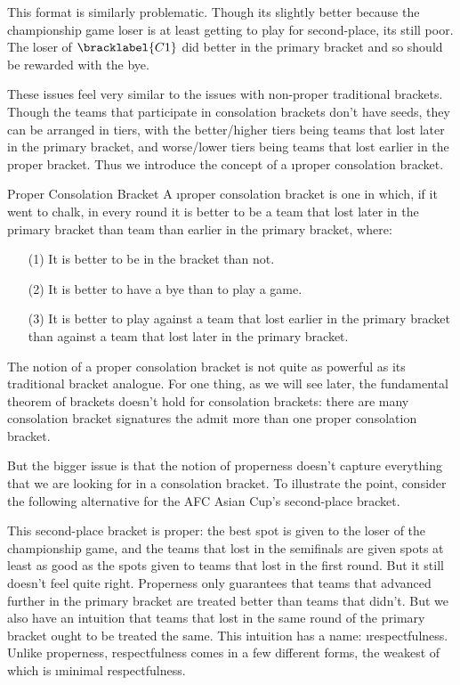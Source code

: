 {    

    This format is similarly problematic. Though its slightly better because the championship game loser is at least getting to play for second-place, its still poor. The loser of $\bracklabel{C1}$ did better in the primary bracket and so should be rewarded with the bye.

    These issues feel very similar to the issues with non-proper traditional brackets. Though the teams that participate in consolation brackets don't have seeds, they can be arranged in tiers, with the better/higher tiers being teams that lost later in the primary bracket, and worse/lower tiers being teams that lost earlier in the proper bracket. Thus we introduce the concept of a \i{proper consolation bracket}.

    \begin{definition}{Proper Consolation Bracket}{}
        A \i{proper consolation bracket} is one in which, if it went to chalk, in every round it is better to be a team that lost later in the primary bracket than team than earlier in the primary bracket, where: \begin{itemize}
            \item[(1)] It is better to be in the bracket than not.
            \item[(2)] It is better to have a bye than to play a game.
            \item[(3)] It is better to play against a team that lost earlier in the primary bracket than against a team that lost later in the primary bracket.
        \end{itemize}
    \end{definition}
    
    The notion of a proper consolation bracket is not quite as powerful as its traditional bracket analogue. For one thing, as we will see later, the fundamental theorem of brackets doesn't hold for consolation brackets: there are many consolation bracket signatures the admit more than one proper consolation bracket.

    But the bigger issue is that the notion of properness doesn't capture everything that we are looking for in a consolation bracket. To illustrate the point, consider the following alternative for the AFC Asian Cup's second-place bracket.


    This second-place bracket is proper: the best spot is given to the loser of the championship game, and the teams that lost in the semifinals are given spots at least as good as the spots given to teams that lost in the first round. But it still doesn't feel quite right. Properness only guarantees that teams that advanced further in the primary bracket are treated better than teams that didn't. But we also have an intuition that teams that lost in the same round of the primary bracket ought to be treated the same. This intuition has a name: \i{respectfulness}. Unlike properness, respectfulness comes in a few different forms, the weakest of which is \i{minimal respectfulness}.    

}

